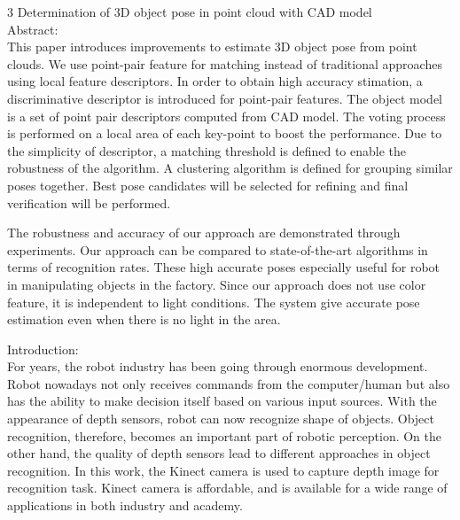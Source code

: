 \documentclass[10]{article}
\begin{document}
3 
Determination of 3D object pose in point cloud with CAD model\\

Abstract:\\
This paper introduces improvements to estimate 3D object pose from point clouds. We use point-pair feature for matching instead of traditional approaches using local feature descriptors. In order to obtain high accuracy  stimation, a discriminative descriptor is introduced for point-pair features. The object model is a set of point pair descriptors computed from CAD model. The voting process is performed on a local area of each key-point to boost the performance. Due to the simplicity of descriptor, a matching threshold is defined to enable the robustness of the algorithm. A clustering algorithm is defined for grouping similar poses together. Best pose candidates will be selected for refining and final verification will be performed. 

The robustness and accuracy of our approach are demonstrated through experiments. Our approach can be compared to state-of-the-art algorithms in terms of recognition rates. These high accurate poses especially useful for robot in manipulating objects in the factory. Since our approach does not use color feature, it is independent to light conditions. The system give accurate pose estimation even when there is no light in the area.

Introduction:\\ 
For years, the robot industry has been going through enormous development. Robot nowadays not only receives commands from the computer/human but also has the ability to make decision itself based on various input sources. With the appearance of depth sensors, robot can now recognize shape of objects. Object recognition, therefore, becomes an important part of robotic perception. On the other hand, the quality of depth sensors lead to different approaches in object recognition. In this work, the Kinect camera is used to capture depth image for recognition task. Kinect camera is affordable, and is available for a wide range of applications in both industry and academy.
\end{document}
